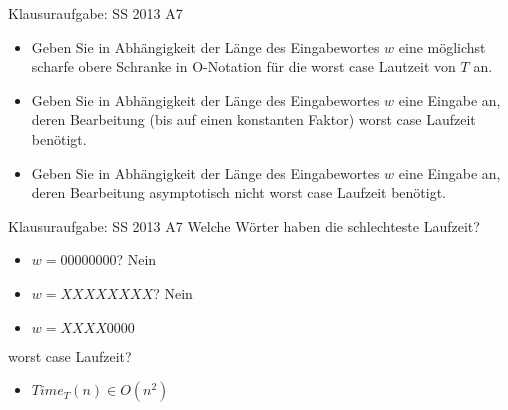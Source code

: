 \begin{frame}{Klausuraufgabe: SS 2013 A7}
  \begin{itemize}
    \item Geben Sie in Abhängigkeit der Länge des Eingabewortes $w$ eine möglichst scharfe obere Schranke in O-Notation für die worst case Lautzeit von $T$ an.
    \item Geben Sie in Abhängigkeit der Länge des Eingabewortes $w$ eine Eingabe an, deren Bearbeitung (bis auf einen konstanten Faktor) worst case Laufzeit benötigt.
    \item Geben Sie in Abhängigkeit der Länge des Eingabewortes $w$ eine Eingabe an, deren Bearbeitung asymptotisch nicht worst case Laufzeit benötigt.
  \end{itemize}
\end{frame}

\begin{frame}{Klausuraufgabe: SS 2013 A7}
  Welche Wörter haben die schlechteste Laufzeit?
  \begin{itemize}
    \item $w=00000000$? \pause Nein
    \pause
    \item $w=XXXXXXXX$? \pause Nein
    \pause
    \item $w=XXXX0000$
  \end{itemize}
  worst case Laufzeit?
  \pause
  \begin{itemize}
    \item $Time_T(n)\in O(n^2)$
  \end{itemize}
\end{frame}
